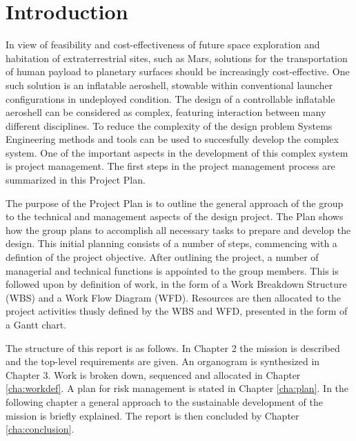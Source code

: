 \section{Introduction}\label{cha:introduction}
In view of feasibility and cost-effectiveness of future space exploration and habitation of extraterrestrial sites, such as Mars, solutions for the transportation of human payload to planetary surfaces should be increasingly cost-effective. One such solution is an inflatable aeroshell, stowable within conventional launcher configurations in undeployed condition. The design of a controllable inflatable aeroshell can be considered as complex, featuring interaction between many different disciplines. To reduce the complexity of the design problem Systems Engineering methods and tools can be used to succesfully develop the complex system. One of the important aspects in the development of this complex system is project management. The first steps in the project management process are summarized in this Project Plan.

The purpose of the Project Plan is to outline the general approach of the group to the technical and management aspects of the design project. The Plan shows how the group plans to accomplish all necessary tasks to prepare and develop the design. This initial planning consists of a number of steps, commencing with a defintion of the project objective. After outlining the project, a number of managerial and technical functions is appointed to the group members. This is followed upon by definition of work, in the form of a Work Breakdown Structure (WBS) and a Work Flow Diagram (WFD). Resources are then allocated to the project activities thusly defined by the WBS and WFD, presented in the form of a Gantt chart.

The structure of this report is as follows. In Chapter 2 the mission is described and the top-level requirements are given. An organogram is synthesized in Chapter 3. Work is broken down, sequenced and allocated in Chapter \ref{cha:workdef}. A plan for risk management is stated in Chapter \ref{cha:plan}.  In the following chapter a general approach to the sustainable development of the mission is briefly explained. The report is then concluded by Chapter \ref{cha:conclusion}.
